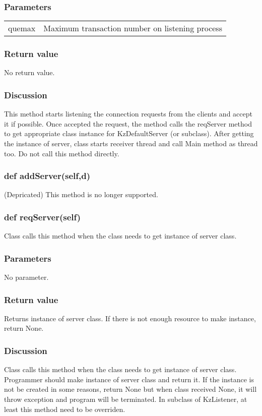 \documentclass[a4paper,10pt]{jsarticle}
\begin{document}
\subsubsection*{Parameters}
\begin{tabular}{ll}
quemax	&Maximum transaction number on listening process
\end{tabular}

\subsubsection*{Return value}
No return value.

\subsubsection*{Discussion}
This method starts listening the connection requests from the clients and accept it if possible.
Once accepted the request, the method calls the reqServer method to get appropriate class instance for KzDefaultServer (or subclass).
After getting the instance of server, class starts receiver thread and call Main method as thread too.
Do not call this method directly.


\subsubsection{def addServer(self,d)}
(Depricated) This method is no longer supported.


\subsubsection{def reqServer(self)}
Class calls this method when the class needs to get instance of server class.

\subsubsection*{Parameters}
No parameter.

\subsubsection*{Return value}
Returns instance of server class. If there is not enough resource to make instance, return None.

\subsubsection*{Discussion}
Class calls this method when the class needs to get instance of server class.
Programmer should make instance of server class and return it. If the instance is not be created in some reasons, return None but when class received None, it will throw exception and program will be terminated.
In subclass of KzListener, at least this method need to be overriden.
\end{document}
